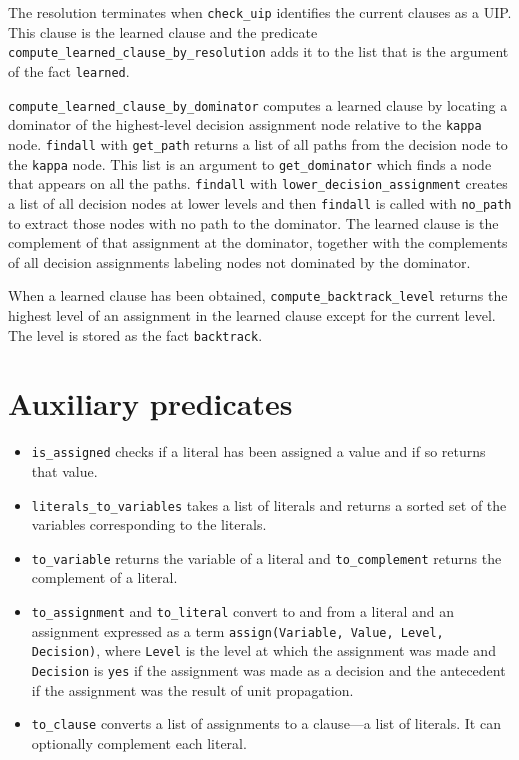 \documentclass[11pt]{report}
\newcommand*{\p}[1]{\textup{\texttt{#1}}}
\begin{document}
The resolution terminates when \p{check\_uip} identifies the current
clauses as a UIP. This clause is the learned clause and the predicate
\p{compute\_learned\_clause\_by\_resolution} adds it to the list that is
the argument of the fact \p{learned}.

\p{compute\_learned\_clause\_by\_dominator} computes a learned clause by
locating a dominator of the highest-level decision assignment node
relative to the \p{kappa} node. \p{findall} with \p{get\_path} returns a
list of all paths from the decision node to the \p{kappa} node. This
list is an argument to \p{get\_dominator} which finds a node that
appears on all the paths. \p{findall} with
\p{lower\_decision\_assignment} creates a list of all decision nodes at
lower levels and then \p{findall} is called with \p{no\_path} to extract
those nodes with no path to the dominator. The learned clause is the
complement of that assignment at the dominator, together with the
complements of all decision assignments labeling nodes not dominated by
the dominator.

When a learned clause has been obtained, \p{compute\_backtrack\_level}
returns the highest level of an assignment in the learned clause except
for the current level. The level is stored as the fact \p{backtrack}.


\section{Auxiliary predicates}\label{s.aux}

\begin{itemize}

\item \p{is\_assigned} checks if a literal has been assigned a value
and if so returns that value.

\item \p{literals\_to\_variables} takes a list of literals and returns a
sorted set of the variables corresponding to the literals.

\item \p{to\_variable} returns the variable of a literal and
\p{to\_complement} returns the complement of a literal.

\item \p{to\_assignment} and \p{to\_literal} convert to and from a
literal and an assignment expressed as a term \p{assign(Variable, Value,
Level, Decision)}, where \p{Level} is the level at which the assignment
was made and \p{Decision} is \p{yes} if the assignment was made as a
decision and the antecedent if the assignment was the result of
unit propagation.

\item \p{to\_clause} converts a list of assignments to a clause---a list
of literals. It can optionally complement each literal.

\end{itemize}




\end{document}
